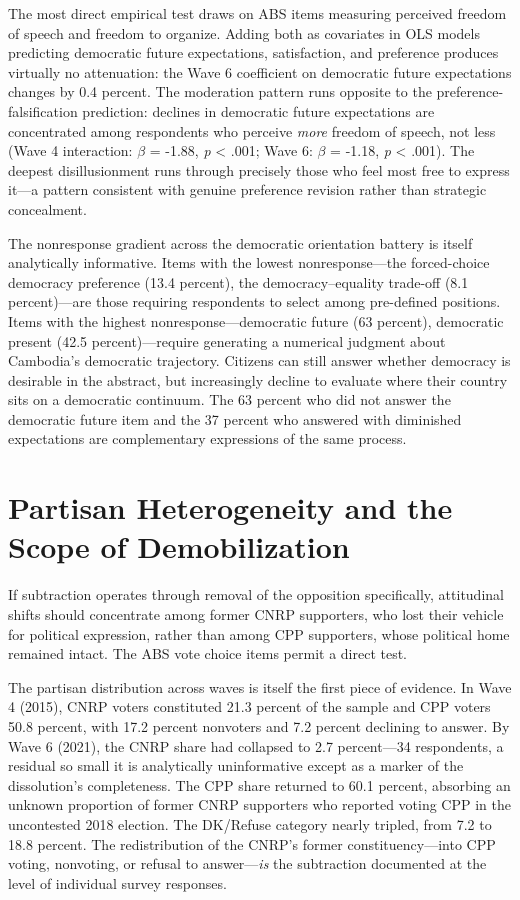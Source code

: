 \documentclass[Review,times,sageh,doublespace]{sagej}
\begin{document}
The most direct empirical test draws on ABS items measuring perceived
freedom of speech and freedom to organize. Adding both as covariates in
OLS models predicting democratic future expectations, satisfaction, and
preference produces virtually no attenuation: the Wave 6 coefficient on
democratic future expectations changes by 0.4 percent. The moderation
pattern runs opposite to the preference-falsification prediction:
declines in democratic future expectations are concentrated among
respondents who perceive \emph{more} freedom of speech, not less (Wave 4
interaction: \(\beta\) = -1.88, \emph{p} \textless{} .001; Wave 6:
\(\beta\) = -1.18, \emph{p} \textless{} .001). The deepest
disillusionment runs through precisely those who feel most free to
express it---a pattern consistent with genuine preference revision
rather than strategic concealment.

The nonresponse gradient across the democratic orientation battery is
itself analytically informative. Items with the lowest nonresponse---the
forced-choice democracy preference (13.4 percent), the
democracy--equality trade-off (8.1 percent)---are those requiring
respondents to select among pre-defined positions. Items with the
highest nonresponse---democratic future (63 percent), democratic present
(42.5 percent)---require generating a numerical judgment about
Cambodia's democratic trajectory. Citizens can still answer whether
democracy is desirable in the abstract, but increasingly decline to
evaluate where their country sits on a democratic continuum. The 63
percent who did not answer the democratic future item and the 37 percent
who answered with diminished expectations are complementary expressions
of the same process.

\section{Partisan Heterogeneity and the Scope of
Demobilization}\label{partisan-heterogeneity-and-the-scope-of-demobilization}

If subtraction operates through removal of the opposition specifically,
attitudinal shifts should concentrate among former CNRP supporters, who
lost their vehicle for political expression, rather than among CPP
supporters, whose political home remained intact. The ABS vote choice
items permit a direct test.

The partisan distribution across waves is itself the first piece of
evidence. In Wave 4 (2015), CNRP voters constituted 21.3 percent of the
sample and CPP voters 50.8 percent, with 17.2 percent nonvoters and 7.2
percent declining to answer. By Wave 6 (2021), the CNRP share had
collapsed to 2.7 percent---34 respondents, a residual so small it is
analytically uninformative except as a marker of the dissolution's
completeness. The CPP share returned to 60.1 percent, absorbing an
unknown proportion of former CNRP supporters who reported voting CPP in
the uncontested 2018 election. The DK/Refuse category nearly tripled,
from 7.2 to 18.8 percent. The redistribution of the CNRP's former
constituency---into CPP voting, nonvoting, or refusal to
answer---\emph{is} the subtraction documented at the level of individual
survey responses.
\end{document}
